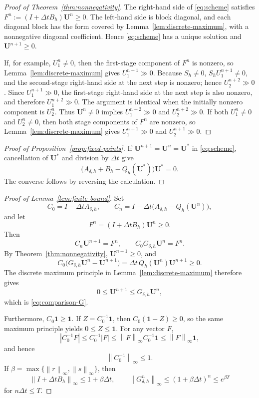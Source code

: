 \documentclass[11pt]{article}
\theoremstyle{definition}
\newcommand{\norm}[1]{\left\lVert #1\right\rVert}
\newcommand{\one}{\mathbf{1}}
\newcommand{\U}{\bm U}
\begin{document}
\begin{proof}[Proof of Theorem~\ref{thm:nonnegativity}]
The right-hand side of \eqref{eq:scheme} satisfies $F^n:=(I+\Delta t B_h)\U^n\ge0$.
The left-hand side is block diagonal, and each diagonal block has the form
covered by Lemma~\ref{lem:discrete-maximum}, with a nonnegative diagonal
coefficient.  Hence \eqref{eq:scheme} has a unique solution and
$\U^{n+1}\ge0$.

If, for example, $U_1^n\ne0$, then the first-stage component of $F^n$ is
nonzero, so Lemma~\ref{lem:discrete-maximum} gives $U_1^{n+1}\gg0$.
Because $S_h\ne0$, $S_hU_1^{n+1}\ne0$, and the second-stage right-hand side at the next step is nonzero; hence
$U_2^{n+2}\gg0$.  Since $U_1^{n+1}\gg0$, the first-stage right-hand side
at the next step is also nonzero, and therefore $U_1^{n+2}\gg0$.  The
argument is identical when the initially nonzero component is $U_2^n$.
Thus $\U^n\ne0$ implies $U_1^{n+2}\gg0$ and $U_2^{n+2}\gg0$.  If both $U_1^n\ne0$ and $U_2^n\ne0$, then both stage components of $F^n$ are nonzero, so Lemma~\ref{lem:discrete-maximum} gives $U_1^{n+1}\gg0$ and $U_2^{n+1}\gg0$.
\end{proof}

\begin{proof}[Proof of Proposition~\ref{prop:fixed-points}]
If $\U^{n+1}=\U^n=\U^*$ in \eqref{eq:scheme}, cancellation of $\U^*$ and division by $\Delta t$ give
\[
 \big(A_{\delta,h}+B_h-Q_h(\U^*)\big)\U^*=0.
\]
The converse follows by reversing the calculation.
\end{proof}

\begin{proof}[Proof of Lemma~\ref{lem:finite-bound}]
Set
\[
 C_0=I-\Delta tA_{\delta,h},
 \qquad
 C_n=I-\Delta t\big(A_{\delta,h}-Q_h(\U^n)\big),
\]
and let
\[
 F^n=(I+\Delta tB_h)\U^n\ge0.
\]
Then
\[
 C_n\U^{n+1}=F^n,
 \qquad
 C_0G_{\delta,h}\U^n=F^n.
\]
By Theorem~\ref{thm:nonnegativity}, $\U^{n+1}\ge0$, and
\[
 C_0\big(G_{\delta,h}\U^n-\U^{n+1}\big)
 =\Delta t\,Q_h(\U^n)\U^{n+1}\ge0.
\]
The discrete maximum principle in Lemma~\ref{lem:discrete-maximum} therefore
gives
\[
 0\le\U^{n+1}\le G_{\delta,h}\U^n,
\]
which is \eqref{eq:comparison-G}.

Furthermore, $C_0\one\ge\one$.  If $Z=C_0^{-1}\one$, then $C_0(\one-Z)\ge0$, so the same maximum principle yields $0\le Z\le\one$.
For any vector $F$,
\[
 |C_0^{-1}F|
 \le C_0^{-1}|F|
 \le \norm{F}_\infty C_0^{-1}\one
 \le \norm{F}_\infty\one,
\]
and hence
\[
 \norm{C_0^{-1}}_\infty\le1.
\]
If $\beta=\max\{\norm{r}_\infty,\norm{s}_\infty\}$, then
\[
 \norm{I+\Delta tB_h}_\infty
 \le1+\beta\Delta t,
 \qquad
 \norm{G_{\delta,h}^n}_\infty
 \le(1+\beta\Delta t)^n
 \le e^{\beta T}
\]
for $n\Delta t\le T$.
\end{proof}
\end{document}
